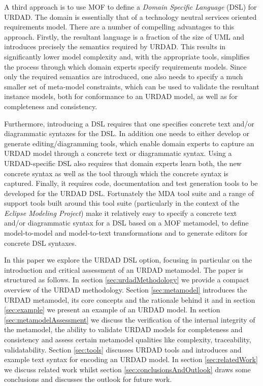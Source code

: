 A third approach is to use MOF to define a {\em Domain Specific Language} (DSL) for URDAD. The domain is essentially that of a technology neutral services oriented requirements model. There are a number of compelling advantages to this approach. Firstly, the resultant language is a fraction of the size of UML and introduces precisely the semantics required by URDAD. This results in significantly lower model complexity and, with the appropriate tools, simplifies the process through which domain experts specify requirements models. Since only the required semantics are introduced, one also needs to specify a much smaller set of meta-model constraints, which can be used to validate the resultant instance models, both for conformance to an URDAD model, as well as for completeness and consistency.

Furthermore, introducing a DSL requires that one specifies concrete text and/or diagrammatic syntaxes for the DSL. In addition one needs to either develop or generate editing/diagramming tools, which enable domain experts to capture an URDAD model through a concrete text or diagrammatic syntax. Using a URDAD-specific DSL also requires that domain experts learn both, the new concrete syntax as well as the tool through which the concrete syntax is captured. Finally, it requires code, documentation and test generation tools to be developed for the URDAD DSL. Fortunately the MDA tool suite and a range of support tools built around this tool suite (particularly in the context of the {\em Eclipse Modeling Project}) make it relatively easy to specify a concrete text and/or diagrammatic syntax for a DSL based on a MOF metamodel, to define model-to-model and model-to-text transformations and to generate editors for concrete DSL syntaxes.

In this paper we explore the URDAD DSL option, focusing in particular on the introduction and critical assessment of an URDAD metamodel. The paper is structured as follows. In section \ref{sec:urdadMethodology} we provide a compact overview of the URDAD methodology. Section \ref{sec:metamodel} introduces the URDAD metamodel, its core concepts and the rationale behind it and in section \ref{sec:example} we present an example of an URDAD model. In section \ref{sec:metamodelAssessment} we discuss the verification of the internal integrity of the metamodel, the ability to validate URDAD models for completeness and consistency and assess certain metamodel qualities like complexity, traceability, validatability. Section \ref{sec:tools} discusses URDAD tools and introduces and example text syntax for encoding an URDAD model. In section \ref{sec:relatedWork} we discuss related work whilst section \ref{sec:conclusionsAndOutlook} draws some conclusions and discusses the outlook for future work.

